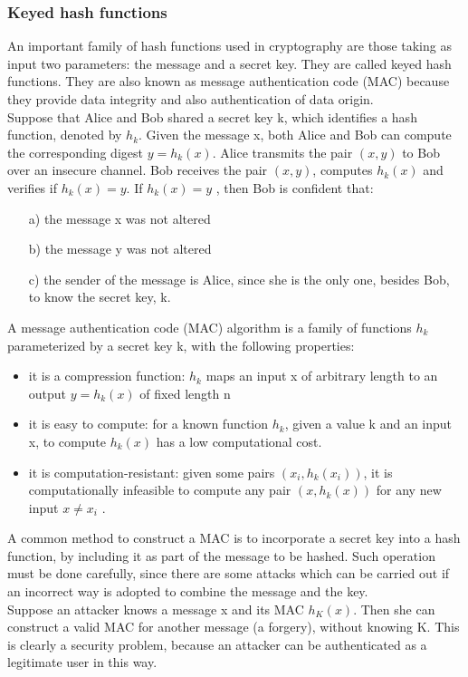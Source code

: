 \documentclass[a4paper, 10pt, titlepage]{article}
\begin{document}
\subsubsection{Keyed hash functions}
An important family of hash functions used in cryptography are those taking as input two parameters: the message and a secret key. They are called keyed hash functions.
They are also known as message authentication code (MAC) because they provide data integrity and also authentication of data origin. \\
Suppose that Alice and Bob shared a secret key k, which identifies a hash function, denoted by $h_k$.
Given the message x, both Alice and Bob can compute the corresponding digest $y = h_k(x)$.
Alice transmits the pair $(x,y)$ to Bob over an insecure channel.
Bob receives the pair $(x,y)$, computes $h_k(x)$ and verifies if $h_k(x) = y$.
If $h_k(x) = y$ , then Bob is confident that:
\begin{itemize}
\item[a)] the message x was not altered
\item[b)] the message y was not altered
\item[c)] the sender of the message is Alice, since she is the only one, besides Bob, to know the secret key, k.
\end{itemize}
A message authentication code (MAC) algorithm is a family of functions $h_k$ parameterized by a secret key k, with the following
properties:
\begin{itemize}
\item  it is a compression function: $h_k$ maps an input x of arbitrary length to an output $y = h_k(x)$ of fixed length n
\item it is easy to compute: for a known function $h_k$, given a value k and an input x, to compute $h_k(x)$ has a low computational cost.
\item it is computation-resistant: given some pairs $(x_i, h_k(x_i))$, it is computationally infeasible to compute any pair $(x, h_k(x))$ for any new input $x \neq x_i$ .
\end{itemize}
A common method to construct a MAC is to incorporate a secret key into a hash function, by including it as part of the message to be hashed. Such operation must be done carefully, since there are some attacks which can be carried out if an incorrect way is adopted to combine the message and the key. \medskip \\
Suppose an attacker knows a message x and its MAC $h_K(x)$.
Then she can construct a valid MAC for another message (a
forgery), without knowing K. This is clearly a security problem, because an attacker can be authenticated as a legitimate user in this way.
\end{document}
